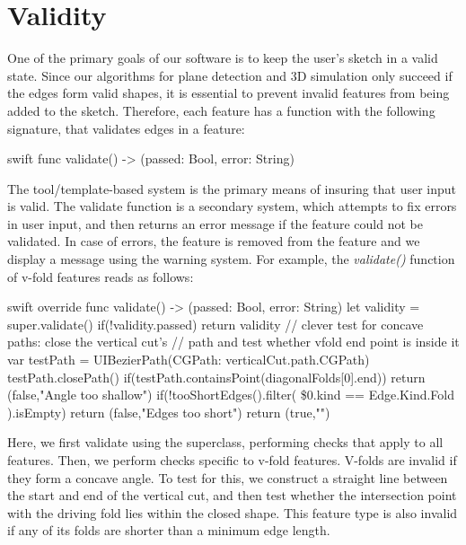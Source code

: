 \section{Validity}\label{validity}

One of the primary goals of our software is to keep the user's sketch in
a valid state. Since our algorithms for plane detection and 3D
simulation only succeed if the edges form valid shapes, it is essential
to prevent invalid features from being added to the sketch. Therefore,
each feature has a function with the following signature, that validates
edges in a feature:

\begin{pygmented}{swift}
func validate() -> (passed: Bool, error: String) 
\end{pygmented}

The tool/template-based system is the primary means of insuring that
user input is valid. The validate function is a secondary system, which
attempts to fix errors in user input, and then returns an error message
if the feature could not be validated. In case of errors, the feature is
removed from the feature and we display a message using the warning
system. For example, the \emph{validate()} function of v-fold features
reads as follows:

\singlespacing 

\begin{pygmented}{swift}
override func validate() -> (passed: Bool, error: String) {
 let validity = super.validate()    
 if(!validity.passed){
    return validity
 }
 // clever test for concave paths: close the vertical cut's
 // path and test whether vfold end point is inside it
 var testPath = UIBezierPath(CGPath: verticalCut.path.CGPath)
 testPath.closePath()
 if(testPath.containsPoint(diagonalFolds[0].end)){
    return (false,"Angle too shallow")
 }
 if(!tooShortEdges().filter({
    \$0.kind == Edge.Kind.Fold
    }).isEmpty){
        return (false,"Edges too short")
 }
    return (true,"")
 }
\end{pygmented}

\doublespacing

Here, we first validate using the superclass, performing checks that
apply to all features. Then, we perform checks specific to v-fold
features. V-folds are invalid if they form a concave angle. To test for
this, we construct a straight line between the start and end of the
vertical cut, and then test whether the intersection point with the
driving fold lies within the closed shape. This feature type is also
invalid if any of its folds are shorter than a minimum edge length.

